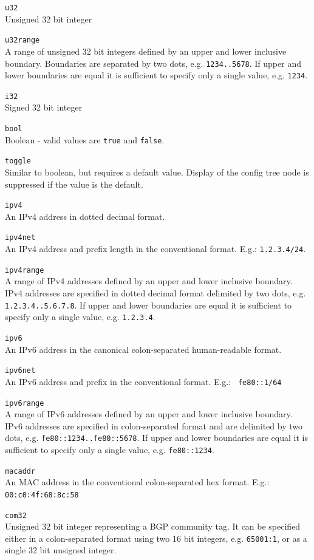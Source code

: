 \documentclass[11pt]{article}
\begin{document}
\begin{description}
\item{\tt u32}\\
Unsigned 32 bit integer
\item{\tt u32range}\\
A range of unsigned 32 bit integers defined by an upper and lower
inclusive boundary.  Boundaries are separated by two dots,
e.g. {\tt 1234..5678}.  If upper and lower boundaries are equal it is
sufficient to specify only a single value, e.g. {\tt 1234}.
\item{\tt i32}\\
Signed 32 bit integer
\item{\tt bool}\\
Boolean - valid values are {\tt true} and {\tt false}.
\item{\tt toggle}\\
Similar to boolean, but requires a default value.  Display of the
config tree node is suppressed if the value is the default.
\item{\tt ipv4}\\
An IPv4 address in dotted decimal format.
\item{\tt ipv4net}\\ An IPv4 address and prefix length in the
conventional format.  E.g.: {\tt 1.2.3.4/24}.
\item{\tt ipv4range}\\
A range of IPv4 addresses defined by an upper and lower inclusive boundary.
IPv4 addresses are specified in dotted decimal format delimited by two dots,
e.g. {\tt 1.2.3.4..5.6.7.8}. If upper and lower boundaries are equal it is
sufficient to specify only a single value, e.g. {\tt 1.2.3.4}.
\item{\tt ipv6}\\
An IPv6 address in the canonical colon-separated human-readable format.
\item{\tt ipv6net}\\
An IPv6 address and prefix in the conventional format. E.g.: {\tt
fe80::1/64}
\item{\tt ipv6range}\\
A range of IPv6 addresses defined by an upper and lower inclusive boundary.
IPv6 addresses are specified in colon-separated format and are delimited
by two dots, e.g. {\tt fe80::1234..fe80::5678}.
If upper and lower boundaries are equal it is
sufficient to specify only a single value, e.g. {\tt fe80::1234}.
\item{\tt macaddr}\\
An MAC address in the conventional colon-separated hex format.  E.g.:
{\tt 00:c0:4f:68:8c:58}
\item{\tt com32}\\
Unsigned 32 bit integer representing a BGP community tag.  It can be
specified either in a colon-separated format using two 16 bit integers,
e.g. {\tt 65001:1}, or as a single 32 bit unsigned integer.
\end{description}
\end{document}
